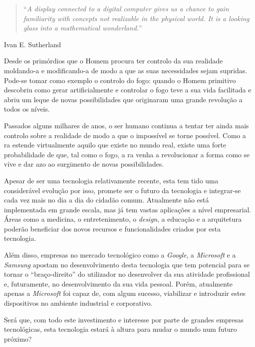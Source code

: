 \documentclass{report}
\begin{document}
\begin{quote}
    ``\emph{A display connected to a digital computer gives us a chance to gain familiarity with concepts not realizable in the physical world. It is a looking glass into a mathematical wonderland.}''\cite{Sutherland65theultimate}
\end{quote}
\begin{flushright}
Ivan E. Sutherland
\end{flushright}

Desde os primórdios que o Homem procura ter controlo da sua realidade moldando-a e modificando-a de modo a que as suas necessidades sejam supridas. Pode-se tomar como exemplo o controlo do fogo: quando o Homem primitivo descobriu como gerar artificialmente e controlar o fogo teve a sua vida facilitada e abriu um leque de novas possibilidades que originaram uma grande revolução a todos os níveis.

Passados alguns milhares de anos, o ser humano continua a tentar ter ainda mais controlo sobre a realidade de modo a que o impossível se torne possível. Como a \ac{ra} estende virtualmente aquilo que existe no mundo real, existe uma forte probabilidade de que, tal como o fogo, a \ac{ra} venha a revolucionar a forma como se vive e dar azo ao surgimento de novas possibilidades.

Apesar de ser uma tecnologia relativamente recente, esta tem tido uma considerável evolução por isso, promete ser o futuro da tecnologia e integrar-se cada vez mais no dia a dia do cidadão comum. Atualmente não está implementada em grande escala, mas já tem vastas aplicações a nível empresarial. Áreas como a medicina, o entretenimento, o \textit{design}, a educação e a arquitetura poderão beneficiar dos novos recursos e funcionalidades criados por esta tecnologia.

Além disso, empresas no mercado tecnológico como a \textit{Google}, a \textit{Microsoft} e a \textit{Samsung} apostam no desenvolvimento desta tecnologia que tem potencial para se tornar o “braço-direito” do utilizador no desenvolver da sua atividade profissional e, futuramente, no desenvolvimento da sua vida pessoal. Porém, atualmente apenas a \textit{Microsoft} foi capaz de, com algum sucesso, viabilizar e introduzir estes dispositivos no ambiente industrial e corporativo.

Será que, com todo este investimento e interesse por parte de grandes empresas tecnológicas, esta tecnologia estará à altura para mudar o mundo num futuro próximo?
\end{document}
